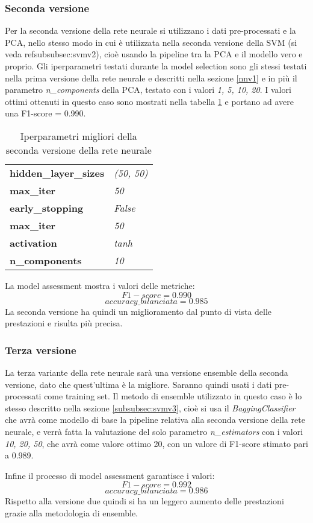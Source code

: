 \subsubsection{Seconda versione}\label{nnv2}
Per la seconda versione della rete neurale si utilizzano i dati pre-processati e la PCA, nello stesso modo in cui è utilizzata nella seconda versione della SVM (si veda ref{subsubsec:svmv2}), cioè usando la pipeline tra la PCA e il modello vero e proprio.  Gli iperparametri testati durante la model selection sono gli stessi testati nella prima versione della rete neurale e descritti nella sezione \ref{nnv1} e in più il parametro \textit{n\_components} della PCA, testato con i valori \textit{1, 5, 10, 20}. I valori ottimi ottenuti in questo caso sono mostrati nella tabella \ref{tab:nnv2} e portano ad avere una F1-score = 0.990.

\begin{table}[h] 
\centering
\begin{tabular}{l l}
\hline
\textbf{hidden\_layer\_sizes} & \textit{(50, 50)}\\
\textbf{max\_iter} & \textit{50}\\
\textbf{early\_stopping} & \textit{False}\\
\textbf{max\_iter} & \textit{50}\\
\textbf{activation} & \textit{tanh}\\
\textbf{n\_components} & \textit{10}\\
\hline
\end{tabular}
\caption{Iperparametri migliori della seconda versione della rete neurale}
\label{tab:nnv2}
\end{table}

La model assessment mostra i valori delle metriche:
$$F1-score = 0.990$$
$$accuracy\_bilanciata = 0.985$$
La seconda versione ha quindi un miglioramento dal punto di vista delle prestazioni e risulta più precisa.

\subsubsection{Terza versione}\label{nnv3}
La terza variante della rete neurale sarà una versione ensemble della seconda versione, dato che quest'ultima è la migliore. Saranno quindi usati i dati pre-processati come training set. Il metodo di ensemble utilizzato in questo caso è lo stesso descritto nella sezione \ref{subsubsec:svmv3}, cioè si usa il \textit{BaggingClassifier} che avrà come modello di base la pipeline relativa alla seconda versione della rete neurale, e verrà fatta la valutazione del solo parametro \textit{n\_estimators} con i valori \textit{10, 20, 50}, che avrà come valore ottimo 20, con un valore di F1-score stimato pari a 0.989.

Infine il processo di model assessment garantisce i valori:
$$F1-score = 0.992$$
$$accuracy\_bilanciata = 0.986$$
Rispetto alla versione due quindi si ha un leggero aumento delle prestazioni grazie alla metodologia di ensemble.